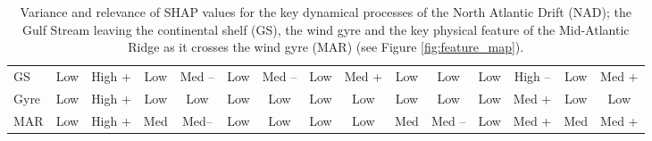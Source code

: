 \documentclass[a4paper]{article}
\begin{document}
\begin{table}
\begin{tabular}{l|cccccccccccccc}
GS                          & {\color[HTML]{FE0000} Low} & \multicolumn{1}{c|}{{\color[HTML]{010066} High +}} & {\color[HTML]{FE0000} Low} & \multicolumn{1}{c|}{{Med --}} & {\color[HTML]{FE0000} Low}  & \multicolumn{1}{c|}{{Med --}}  & {\color[HTML]{FE0000} Low} & \multicolumn{1}{c|}{{Med +}} & {\color[HTML]{FE0000} Low}   & \multicolumn{1}{c|}{{\color[HTML]{009901} Low}}      & {\color[HTML]{FE0000} Low}           & \multicolumn{1}{c|}{{\color[HTML]{FE0000} High --}}           & {\color[HTML]{FE0000} Low}                      & {Med +}                      \\
Gyre                         & {\color[HTML]{FE0000} Low} & \multicolumn{1}{c|}{{\color[HTML]{010066} High +}} & {\color[HTML]{FE0000} Low} & \multicolumn{1}{c|}{{\color[HTML]{009901} Low}}    & {\color[HTML]{FE0000} Low}  & \multicolumn{1}{c|}{{\color[HTML]{009901} Low}}    & {\color[HTML]{FE0000} Low} & \multicolumn{1}{c|}{{\color[HTML]{009901} Low}}   & {\color[HTML]{FE0000} Low}   & \multicolumn{1}{c|}{{\color[HTML]{009901} Low}}      & {\color[HTML]{FE0000} Low}           & \multicolumn{1}{c|}{{Med +}}             & {\color[HTML]{FE0000} Low}                      & {\color[HTML]{009901} Low}                        \\ \hline
MAR                         & {\color[HTML]{FE0000} Low} & \multicolumn{1}{c|}{{\color[HTML]{010066} High +}} & {Med} & \multicolumn{1}{c|}{{Med--}}  & {\color[HTML]{FE0000} Low}  & \multicolumn{1}{c|}{{\color[HTML]{009901} Low}}    & {\color[HTML]{FE0000} Low}  & \multicolumn{1}{c|}{{\color[HTML]{009901} Low}}  & {Med}   & \multicolumn{1}{c|}{{Med --}}   & {\color[HTML]{FE0000} Low}           & \multicolumn{1}{c|}{{Med +}}             & {Med}                      & {Med +}                     
\end{tabular}
\caption{Variance and relevance of SHAP values for the key dynamical processes of the North Atlantic Drift (NAD); the Gulf Stream leaving the continental shelf (GS), the wind gyre and the key physical feature of the Mid-Atlantic Ridge as it crosses the wind gyre (MAR) (see Figure \ref{fig:feature_map}).}
\end{table}
\end{document}
